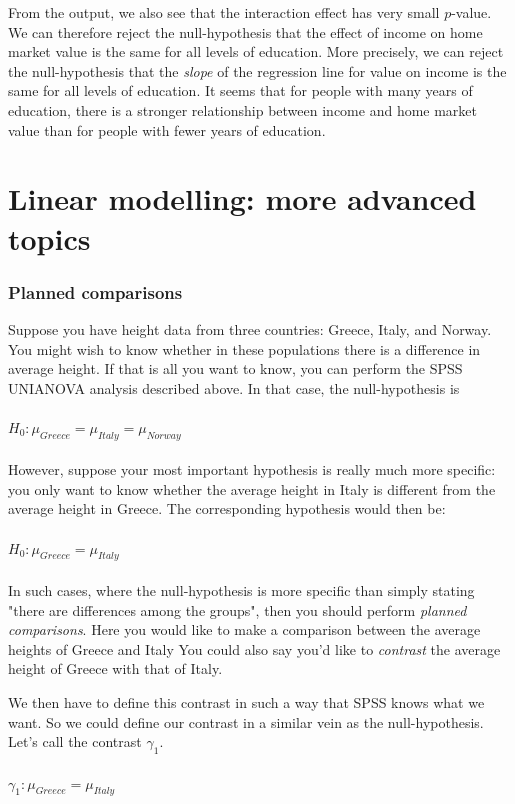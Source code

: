 \documentclass[]{report}\usepackage[]{graphicx}\usepackage[]{color}
\begin{document}
From the output, we also see that the interaction effect has very small $p$-value. We can therefore reject the null-hypothesis that the effect of income on home market value is the same for all levels of education. More precisely, we can reject the null-hypothesis that the \textit{slope} of the regression line for value on income is the same for all levels of education. It seems that for people with many years of education, there is a stronger relationship between income and home market value than for people with fewer years of education. 



\chapter{Linear modelling: more advanced topics}\label{chap:advanced}


\subsection{Planned comparisons}

Suppose you have height data from three countries: Greece, Italy, and Norway. You might wish to know whether in these populations there is a difference in average height. If that is all you want to know, you can perform the SPSS UNIANOVA analysis described above. In that case, the null-hypothesis is
\\
\\
$H_0: \mu_{Greece}=\mu_{Italy}=\mu_{Norway}$
\\
\\
However, suppose your most important hypothesis is really much more specific: you only want to know whether the average height in Italy is different from the average height in Greece. The corresponding hypothesis would then be: 
\\
\\
$H_0: \mu_{Greece}=\mu_{Italy}$
\\
\\
In such cases, where the null-hypothesis is more specific than simply stating "there are differences among the groups", then you should perform \textit{planned comparisons}. Here you would like to make a comparison between the average heights of Greece and Italy You could also say you'd like to \textit{contrast} the average height of Greece with that of Italy. 

We then have to define this contrast in such a way that SPSS knows what we want. So we could define our contrast in a similar vein as the null-hypothesis. Let's call the contrast $\gamma_1$.
\\
\\
$\gamma_1: \mu_{Greece}=\mu_{Italy}$
\\
\\
\end{document}
